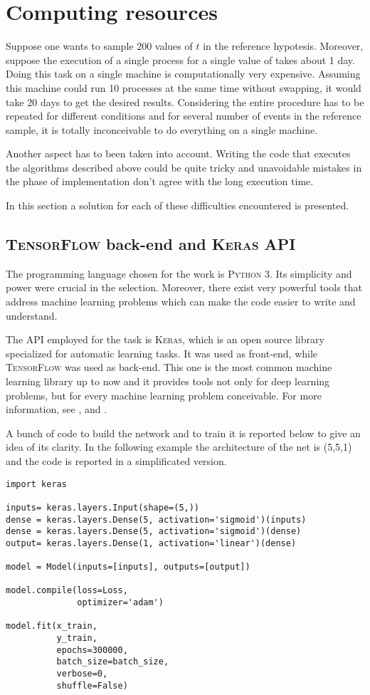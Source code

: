 \section{Computing resources}
Suppose one wants to sample 200 values of $t$ in the reference hypotesis. Moreover, suppose the execution of a single process for a single value of takes about 1 day. Doing this task on a single machine is computationally very expensive. Assuming this machine could run 10 processes at the same time without swapping, it would take 20 days to get the desired results. Considering the entire procedure has to be repeated for different conditions and for several number of events in the reference sample, it is totally inconceivable to do everything on a single machine.

Another aspect has to been taken into account. Writing the code that executes the algorithms described above could be quite tricky and unavoidable mistakes in the phase of implementation don't agree with the long execution time.

In this section a solution for each of these difficulties encountered is presented.



\subsection{\textsc{TensorFlow} back-end and \textsc{Keras} API}
The programming language chosen for the work is \textsc{Python 3}. Its simplicity and power were crucial in the selection. Moreover, there exist very powerful tools that address machine learning problems which can make the code easier to write and understand.

The API employed for the task is \textsc{Keras}, which is an open source library specialized for automatic learning tasks. It was used as front-end, while \textsc{TensorFlow} was used as back-end. This one is the most common machine learning library up to now and it provides tools not only for deep learning problems, but for every machine learning problem conceivable. For more information, see \cite{python}, \cite{keras} and \cite{tensorflow}.

A bunch of code to build the network and to train it is reported below to give an idea of its clarity. In the following example the architecture of the net is (5,5,1) and the code is reported in a simplificated version.

\begin{lstlisting}[frame=single]
import keras

inputs= keras.layers.Input(shape=(5,))
dense = keras.layers.Dense(5, activation='sigmoid')(inputs)
dense = keras.layers.Dense(5, activation='sigmoid')(dense)
output= keras.layers.Dense(1, activation='linear')(dense)

model = Model(inputs=[inputs], outputs=[output])

model.compile(loss=Loss,
              optimizer='adam')

model.fit(x_train, 
          y_train,
          epochs=300000,
          batch_size=batch_size,
          verbose=0,
          shuffle=False)
\end{lstlisting}



